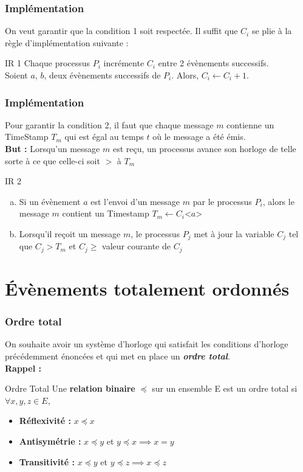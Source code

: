\documentclass[compress]{beamer}
\begin{document}
\begin{frame}
\frametitle{Implémentation}
On veut garantir que la {\color{cyan} condition 1} soit respectée. Il suffit que $C_i$ se plie à la règle d'implémentation suivante : 
\begin{block}{IR 1}
Chaque processus $P_i$ incrémente $C_i$ entre 2 évènements successifs.\\
Soient $a$, $b$, deux évènements successifs de $P_i$. Alors, $C_i \leftarrow C_i + 1$.
\end{block}
\end{frame}

\begin{frame}
	\frametitle{Implémentation}
	Pour garantir la {\color{cyan} condition 2}, il faut que chaque message $m$ contienne un TimeStamp $T_m$ qui est égal au temps $t$ où le message a été émis. \\
	\textbf{But : }Lorsqu'un message $m$ est reçu, un processus avance son horloge de telle sorte à ce que celle-ci soit $>$ à $T_m$
	\begin{block}{IR 2}
	\begin{enumerate}[(a)]
		\item Si un évènement $a$ est l'envoi d'un message $m$ par le processus $P_i$, alors le message $m$ contient un Timestamp $T_m \leftarrow C_i$<$a$>
		\item Lorsqu'il reçoit un message $m$, le processus $P_j$ met à jour la variable $C_j$ tel que $C_j > T_m$ et $C_j \geq$ valeur courante de $C_j$
	\end{enumerate}
	\end{block}
\end{frame}

\section{\'Evènements totalement ordonnés}
\begin{frame}
\frametitle{Ordre total}
On souhaite avoir un système d'horloge qui satisfait les conditions d'horloge précédemment énoncées et qui met en place un \textit{\textbf{ordre total}}.\\
\textbf{Rappel : }
\begin{block}{Ordre Total}
Une \textbf{relation binaire} $\preceq$ sur un ensemble E est un ordre total si $\forall x, y, z \in E$, \\
\begin{itemize}
\item \textbf{Réflexivité :} $x \preceq x$
\item \textbf{Antisymétrie :} $x \preceq y$ et $y \preceq x \implies x = y$
\item \textbf{Transitivité :} $x \preceq y$ et $y \preceq z \implies x \preceq z$
\end{itemize}
\end{block}
\end{frame}
\end{document}
